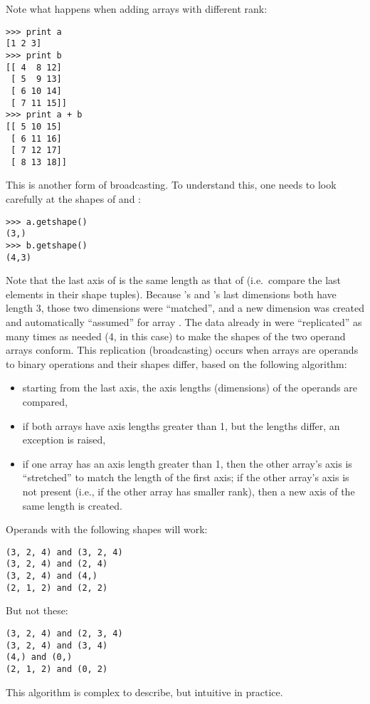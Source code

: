 Note what happens when adding arrays with different rank:
\begin{verbatim}
>>> print a
[1 2 3]
>>> print b
[[ 4  8 12]
 [ 5  9 13]
 [ 6 10 14]
 [ 7 11 15]]
>>> print a + b
[[ 5 10 15]
 [ 6 11 16]
 [ 7 12 17]
 [ 8 13 18]]
\end{verbatim}
This is another form of broadcasting. To understand this,
one needs to look carefully at the shapes of  and :
\begin{verbatim}
>>> a.getshape()
(3,)
>>> b.getshape()
(4,3)
\end{verbatim}
Note that the last axis of  is the same length as that of 
(i.e.\ compare the last elements in their shape tuples).  Because 's
and 's last dimensions both have length 3, those two dimensions were
``matched'', and a new dimension was created and automatically ``assumed'' for
array . The data already in  were ``replicated'' as many 
times as needed (4, in this case) to make the shapes of the two operand 
arrays conform. This
replication (broadcasting) occurs when arrays are operands
to binary operations and their shapes differ, based on the following algorithm:
\begin{itemize}
\item starting from the last axis, the axis lengths (dimensions) of the
   operands are compared,
\item if both arrays have axis lengths greater than 1, but the lengths differ,
   an exception is raised,
\item if one array has an axis length greater than 1, then the other array's
   axis is ``stretched'' to match the length of the first axis; if the other
   array's axis is not present (i.e., if the other array has smaller rank),
   then a new axis of the same length is created.
\end{itemize}

Operands with the following shapes will work:
\begin{verbatim}
(3, 2, 4) and (3, 2, 4)
(3, 2, 4) and (2, 4)
(3, 2, 4) and (4,)
(2, 1, 2) and (2, 2)
\end{verbatim}

But not these:
\begin{verbatim}
(3, 2, 4) and (2, 3, 4)
(3, 2, 4) and (3, 4)
(4,) and (0,)
(2, 1, 2) and (0, 2)
\end{verbatim}

This algorithm is complex to describe, but intuitive in practice.


